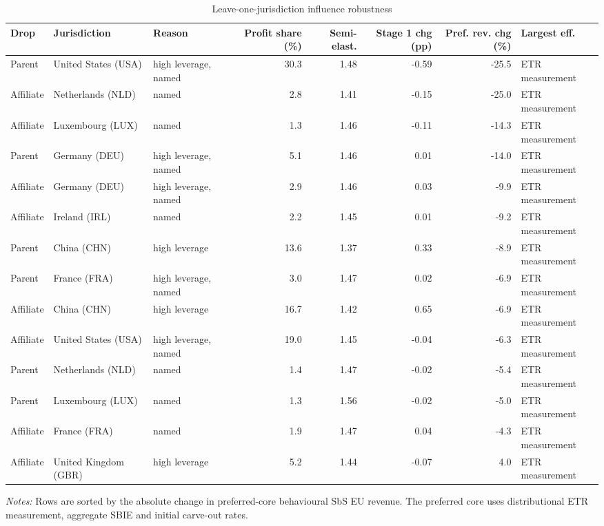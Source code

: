 \begin{table}[H]
\centering
\scriptsize
\setlength{\tabcolsep}{2pt}
\caption{Leave-one-jurisdiction influence robustness}
\label{tab:app_jurisdiction_influence_summary}
\begin{adjustbox}{max width=\textwidth,center}
\begin{tabular}{@{}lL{2.5cm}lrrrrl@{}}
\toprule
Drop & Jurisdiction & Reason & Profit share (\%) & Semi-elast. & Stage 1 chg (pp) & Pref. rev. chg (\%) & Largest eff. \\
\midrule
Parent & United States (USA) & high leverage, named & 30.3 & 1.48 & -0.59 & -25.5 & ETR measurement \\
Affiliate & Netherlands (NLD) & named &  2.8 & 1.41 & -0.15 & -25.0 & ETR measurement \\
Affiliate & Luxembourg (LUX) & named &  1.3 & 1.46 & -0.11 & -14.3 & ETR measurement \\
Parent & Germany (DEU) & high leverage, named &  5.1 & 1.46 &  0.01 & -14.0 & ETR measurement \\
Affiliate & Germany (DEU) & high leverage, named &  2.9 & 1.46 &  0.03 &  -9.9 & ETR measurement \\
Affiliate & Ireland (IRL) & named &  2.2 & 1.45 &  0.01 &  -9.2 & ETR measurement \\
Parent & China (CHN) & high leverage & 13.6 & 1.37 &  0.33 &  -8.9 & ETR measurement \\
Parent & France (FRA) & high leverage, named &  3.0 & 1.47 &  0.02 &  -6.9 & ETR measurement \\
Affiliate & China (CHN) & high leverage & 16.7 & 1.42 &  0.65 &  -6.9 & ETR measurement \\
Affiliate & United States (USA) & high leverage, named & 19.0 & 1.45 & -0.04 &  -6.3 & ETR measurement \\
Parent & Netherlands (NLD) & named &  1.4 & 1.47 & -0.02 &  -5.4 & ETR measurement \\
Parent & Luxembourg (LUX) & named &  1.3 & 1.56 & -0.02 &  -5.0 & ETR measurement \\
Affiliate & France (FRA) & named &  1.9 & 1.47 &  0.04 &  -4.3 & ETR measurement \\
Affiliate & United Kingdom (GBR) & high leverage &  5.2 & 1.44 & -0.07 &   4.0 & ETR measurement \\
\bottomrule
\end{tabular}
\end{adjustbox}

\vspace{0.35em}
\noindent\begin{minipage}{\textwidth}
\footnotesize\raggedright\textit{Notes:} Rows are sorted by the absolute change in preferred-core behavioural SbS EU revenue. The preferred core uses distributional ETR measurement, aggregate SBIE and initial carve-out rates.
\end{minipage}
\end{table}
